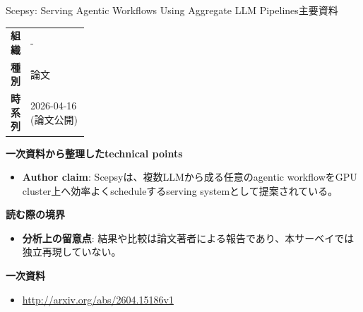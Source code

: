 \begin{technicalnote}{Scepsy: Serving Agentic Workflows Using Aggregate LLM Pipelines}{主要資料}
\begingroup
\begin{tabularx}{\linewidth}{@{}>{\bfseries}p{0.22\linewidth}X@{}}
組織 & - \\
種別 & 論文 \\
時系列 & 2026-04-16 (論文公開) \\
\end{tabularx}
\smallskip
{\bfseries 一次資料から整理したtechnical points}
\begin{itemize}[leftmargin=1.5em,itemsep=0.35em]
\item \textbf{Author claim}: Scepsyは、複数LLMから成る任意のagentic workflowをGPU cluster上へ効率よくscheduleするserving systemとして提案されている。
\end{itemize}
{\bfseries 読む際の境界}
\begin{itemize}[leftmargin=1.5em,itemsep=0.35em]
\item \textbf{分析上の留意点}: 結果や比較は論文著者による報告であり、本サーベイでは独立再現していない。
\end{itemize}
\begin{samepage}
{\bfseries 一次資料}
\begingroup\sloppy
\begin{itemize}[leftmargin=1.5em,itemsep=0.25em]
\item {\scriptsize\url{http://arxiv.org/abs/2604.15186v1}}
\end{itemize}
\endgroup
\end{samepage}
\endgroup
\end{technicalnote}
\medskip

